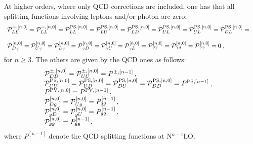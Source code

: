 \documentclass[10pt,a4paper]{article}
\begin{document}
At higher orders, where only QCD corrections are included, one has
that all splitting functions involving leptons and/or photon are zero:
\begin{equation}
\begin{array}{l}
  \mathcal{P}_{LL}^{+,[n,0]}=\mathcal{P}_{LL}^{-,[n,0]}=\mathcal{P}^{{\rm
  PS} ,[n,0]}_{LL}= \mathcal{P}^{{\rm PS}
  ,[n,0]}_{LU}=\mathcal{P}^{{\rm PS} ,[n,0]}_{LD}=\mathcal{P}^{{\rm
  PS} ,[n,0]}_{UL}=\mathcal{P}^{{\rm PS}
  ,[n,0]}_{UL}=\mathcal{P}^{{\rm PS} ,[n,0]}_{DL}=\\
  \\
  \mathcal{P}_{D\gamma}^{[n,0]}=\mathcal{P}_{U\gamma}^{[n,0]}=\mathcal{P}_{L\gamma}^{[n,0]}=\mathcal{P}_{\gamma D}^{[n,0]}=\mathcal{P}_{\gamma U}^{[n,0]}=\mathcal{P}_{\gamma L}^{[n,0]}=\mathcal{P}_{g\gamma}^{[n,0]}=\mathcal{P}_{\gamma g}^{[n,0]}=\mathcal{P}_{\gamma\gamma}^{[n,0]}=0\,,
\end{array}
\end{equation}
for $n\geq3$. The others are given by the QCD ones as follows:
\begin{equation}
  \begin{array}{l}
    \mathcal{P}_{DD}^{\pm,[n,0]}=\mathcal{P}_{UU}^{\pm,[n,0]}=P^{\pm,[n-1]}\,,\\
\mathcal{P}^{{\rm PS},[n,0]}_{UU}=\mathcal{P}^{{\rm
    PS},[n,0]}_{UD}=\mathcal{P}^{{\rm
    PS},[n,0]}_{DU}=\mathcal{P}^{{\rm PS},[n,0]}_{DD}=P^{{\rm PS},[n-1]}\,,\\
P^{{\rm PV},[n,0]}=P^{{\rm PV},[n-1]}\,,\\
\mathcal{P}_{Dg}^{[n,0]}=\mathcal{P}_{Ug}^{[n,0]}=P_{qg}^{[n-1]}\,,\\
\mathcal{P}_{gD}^{[n,0]}=\mathcal{P}_{gU}^{[n,0]}=P_{gq}^{[n-1]}\,,\\
\mathcal{P}_{gg}^{[n,0]}=P_{gg}^{[n-1]}\,,
  \end{array}
\end{equation}
where $P^{[n-1]}$ denote the QCD splitting functions at N$^{n-1}$LO.
\end{document}
